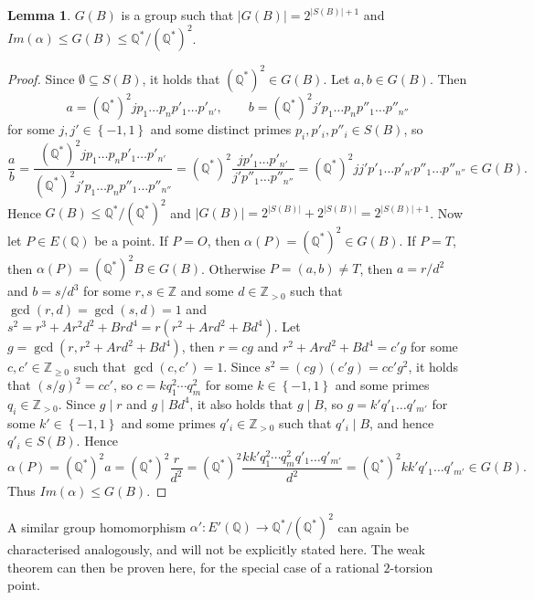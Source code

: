 \documentclass{article}
\newcommand{\Z}{\mathbb{Z}}
\newcommand{\Q}{\mathbb{Q}}
\newcommand{\rb}[1]{\left( #1 \right)}
\newcommand{\cb}[1]{\left\{ #1 \right\}}
\newcommand{\abs}[1]{\left\lvert #1 \right\rvert}
\theoremstyle{definition}\newtheorem*{definition}{Definition}
\theoremstyle{definition}\newtheorem*{example}{Example}
\theoremstyle{definition}\newtheorem*{remark}{Remark}
\newtheorem{lemma}[proposition]{Lemma}
\begin{document}
\begin{lemma}
$ G\rb{B} $ is a group such that $ \abs{G\rb{B}} = 2^{\abs{S\rb{B}} + 1} $ and $ Im\rb{\alpha} \le G\rb{B} \le \Q^* / \rb{\Q^*}^2 $.
\end{lemma}

\begin{proof}
Since $ \emptyset \subseteq S\rb{B} $, it holds that $ \rb{\Q^*}^2 \in G\rb{B} $. Let $ a, b \in G\rb{B} $. Then
$$ a = \rb{\Q^*}^2 j p_1 \dots p_n p'_1 \dots p'_{n'}, \qquad b = \rb{\Q^*}^2 j' p_1 \dots p_n p''_1 \dots p''_{n''} $$
for some $ j, j' \in \cb{-1, 1} $ and some distinct primes $ p_i, p'_i, p''_i \in S\rb{B} $, so
$$ \dfrac{a}{b} = \dfrac{\rb{\Q^*}^2 j p_1 \dots p_n p'_1 \dots p'_{n'}}{\rb{\Q^*}^2 j' p_1 \dots p_n p''_1 \dots p''_{n''}} = \rb{\Q^*}^2\dfrac{j p'_1 \dots p'_{n'}}{j' p''_1 \dots p''_{n''}} = \rb{\Q^*}^2 j j' p'_1 \dots p'_{n'} p''_1 \dots p''_{n''} \in G\rb{B}. $$
Hence $ G\rb{B} \le \Q^* / \rb{\Q^*}^2 $ and $ \abs{G\rb{B}} = 2^{\abs{S\rb{B}}} + 2^{\abs{S\rb{B}}} = 2^{\abs{S\rb{B}} + 1} $. Now let $ P \in E\rb{\Q} $ be a point. If $ P = O $, then $ \alpha\rb{P} = \rb{\Q^*}^2 \in G\rb{B} $. If $ P = T $, then $ \alpha\rb{P} = \rb{\Q^*}^2B \in G\rb{B} $. Otherwise $ P = \rb{a, b} \ne T $, then $ a = r / d^2 $ and $ b = s / d^3 $ for some $ r, s \in \Z $ and some $ d \in \Z_{> 0} $ such that $ \gcd\rb{r, d} = \gcd\rb{s, d} = 1 $ and $ s^2 = r^3 + Ar^2d^2 + Brd^4 = r\rb{r^2 + Ard^2 + Bd^4} $. Let $ g = \gcd\rb{r, r^2 + Ard^2 + Bd^4} $, then $ r = cg $ and $ r^2 + Ard^2 + Bd^4 = c'g $ for some $ c, c' \in \Z_{\ge 0} $ such that $ \gcd\rb{c, c'} = 1 $. Since $ s^2 = \rb{cg}\rb{c'g} = cc'g^2 $, it holds that $ \rb{s / g}^2 = cc' $, so $ c = k q_1^2 \cdots q_m^2 $ for some $ k \in \cb{-1, 1} $ and some primes $ q_i \in \Z_{> 0} $. Since $ g \mid r $ and $ g \mid Bd^4 $, it also holds that $ g \mid B $, so $ g = k' q'_1 \dots q'_{m'} $ for some $ k' \in \cb{-1, 1} $ and some primes $ q'_i \in \Z_{> 0} $ such that $ q'_i \mid B $, and hence $ q'_i \in S\rb{B} $. Hence
$$ \alpha\rb{P} = \rb{\Q^*}^2a = \rb{\Q^*}^2\dfrac{r}{d^2} = \rb{\Q^*}^2\dfrac{k k' q_1^2 \cdots q_m^2 q'_1 \dots q'_{m'}}{d^2} = \rb{\Q^*}^2 k k' q'_1 \dots q'_{m'} \in G\rb{B}. $$
Thus $ Im\rb{\alpha} \le G\rb{B} $.
\end{proof}

A similar group homomorphism $ \alpha' : E'\rb{\Q} \to \Q^* / \rb{\Q^*}^2 $ can again be characterised analogously, and will not be explicitly stated here. The weak theorem can then be proven here, for the special case of a rational $ 2 $-torsion point.
\end{document}
